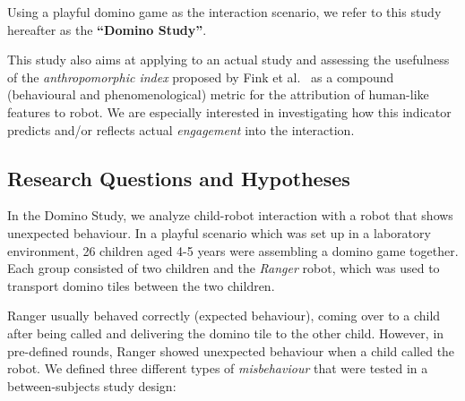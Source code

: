 \documentclass{sig-alternate}
\begin{document}
Using a playful domino game as the interaction scenario, we refer to this study
hereafter as the \textbf{``Domino Study''}.

This study also aims at applying to an actual study and assessing the usefulness
of the \emph{anthropomorphic index} proposed by Fink et
al.~\cite{fink2014dynamics} as a compound (behavioural and phenomenological)
metric for the attribution of human-like features to robot. We are especially
interested in investigating how this indicator predicts and/or reflects actual
\emph{engagement} into the interaction.

\subsection{Research Questions and Hypotheses}

In the Domino Study, we analyze child-robot interaction with a robot that shows
unexpected behaviour. In a playful scenario which was set up in a laboratory
environment, 26 children aged 4-5 years were assembling a domino game together.
Each group consisted of two children and the \emph{Ranger} robot, which was used
to transport domino tiles between the two children.

Ranger usually behaved correctly (expected behaviour), coming over to a child
after being called and delivering the domino tile to the other child. However,
in pre-defined rounds, Ranger showed unexpected behaviour when a child called the
robot. We defined three different types of \textit{misbehaviour} that were tested
in a between-subjects study design:
\end{document}
